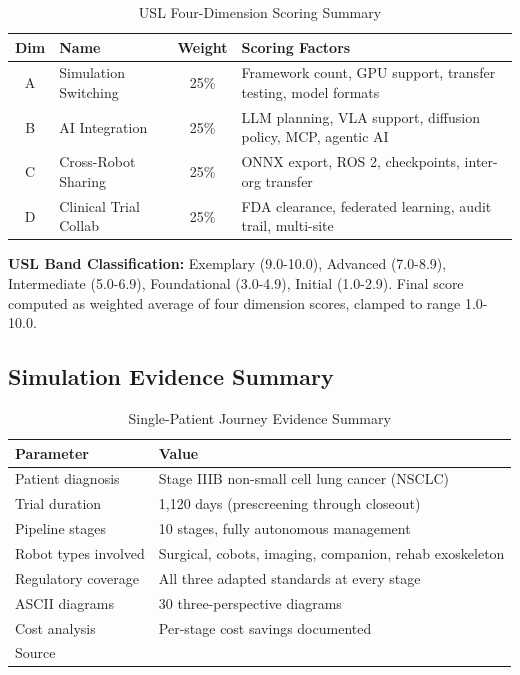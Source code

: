 \begin{table}[H]
\centering
\caption{USL Four-Dimension Scoring Summary}
\label{tab:usl-scoring}
\small
\begin{tabularx}{\textwidth}{c l c X}
\toprule
\textbf{Dim} & \textbf{Name} & \textbf{Weight} & \textbf{Scoring Factors} \\
\midrule
A & Simulation Switching & 25\% & Framework count, GPU support, transfer testing, model formats \\
B & AI Integration & 25\% & LLM planning, VLA support, diffusion policy, MCP, agentic AI \\
C & Cross-Robot Sharing & 25\% & ONNX export, ROS 2, checkpoints, inter-org transfer \\
D & Clinical Trial Collab & 25\% & FDA clearance, federated learning, audit trail, multi-site \\
\bottomrule
\end{tabularx}
\end{table}

\noindent\textbf{USL Band Classification:} Exemplary (9.0-10.0), Advanced
(7.0-8.9), Intermediate (5.0-6.9), Foundational (3.0-4.9), Initial (1.0-2.9).
Final score computed as weighted average of four dimension scores, clamped to
range 1.0-10.0.

\newpage

\subsection{Simulation Evidence Summary}
\label{app:simulation}

\begin{table}[H]
\centering
\caption{Single-Patient Journey Evidence Summary}
\label{tab:single-patient}
\small
\begin{tabularx}{\textwidth}{l X}
\toprule
\textbf{Parameter} & \textbf{Value} \\
\midrule
Patient diagnosis & Stage IIIB non-small cell lung cancer (NSCLC) \\
Trial duration & 1,120 days (prescreening through closeout) \\
Pipeline stages & 10 stages, fully autonomous management \\
Robot types involved & Surgical, cobots, imaging, companion, rehab exoskeleton \\
Regulatory coverage & All three adapted standards at every stage \\
ASCII diagrams & 30 three-perspective diagrams \\
Cost analysis & Per-stage cost savings documented \\
Source & \cite{patient-journey-paper} \\
\bottomrule
\end{tabularx}
\end{table}

